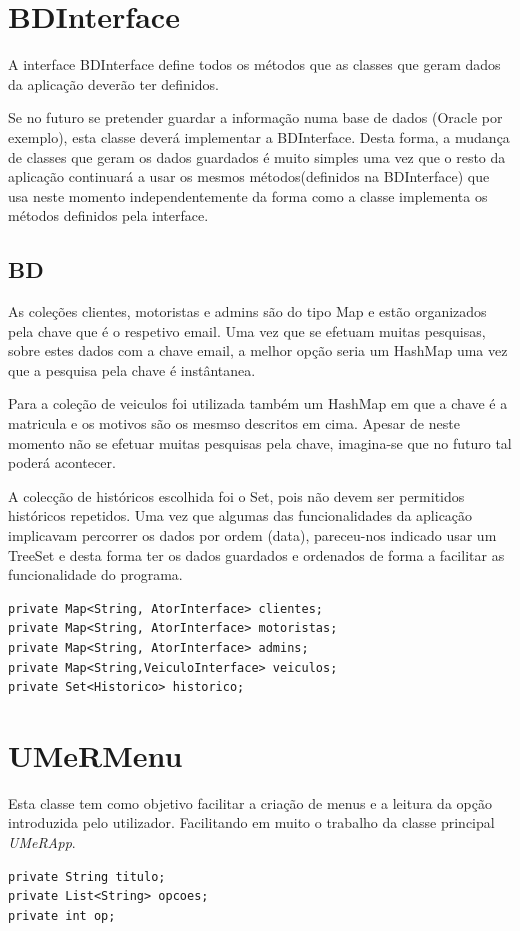 \section{BDInterface}
A interface BDInterface define todos os métodos que as classes que geram dados da aplicação deverão ter definidos. 

Se no futuro se pretender guardar a informação numa base de dados (Oracle por exemplo), esta classe deverá implementar a BDInterface. Desta forma, a mudança de classes que geram os dados guardados é muito simples uma vez que o resto da aplicação continuará a usar os mesmos métodos(definidos na BDInterface) que usa neste momento independentemente da forma como a classe implementa os métodos definidos pela interface. 

\subsection{BD}

As coleções clientes, motoristas e admins são do tipo Map e estão organizados pela chave que é o respetivo email. Uma vez que se efetuam muitas pesquisas, sobre estes dados com a chave email, a melhor opção seria um HashMap uma vez que a pesquisa pela chave é instântanea. 

Para a coleção de veiculos foi utilizada também um HashMap em que a chave é a matricula e os motivos são os mesmso descritos em cima.  Apesar de neste momento não se efetuar muitas pesquisas pela chave, imagina-se que no futuro tal poderá acontecer. 

A colecção de históricos escolhida foi o Set, pois não devem ser permitidos históricos repetidos. Uma vez que algumas das funcionalidades da aplicação implicavam percorrer os dados por ordem (data), pareceu-nos indicado usar um TreeSet e desta forma ter os dados guardados e ordenados de forma a facilitar as funcionalidade do programa.  

\begin{verbatim}
private Map<String, AtorInterface> clientes;
private Map<String, AtorInterface> motoristas; 
private Map<String, AtorInterface> admins; 
private Map<String,VeiculoInterface> veiculos; 
private Set<Historico> historico;
\end{verbatim}

\section{UMeRMenu}

Esta classe tem como objetivo facilitar a criação de menus e a leitura da opção introduzida pelo utilizador. 
Facilitando em muito o trabalho da classe principal \textit{UMeRApp}. 
\begin{verbatim}
private String titulo;
private List<String> opcoes;
private int op;
\end{verbatim}

